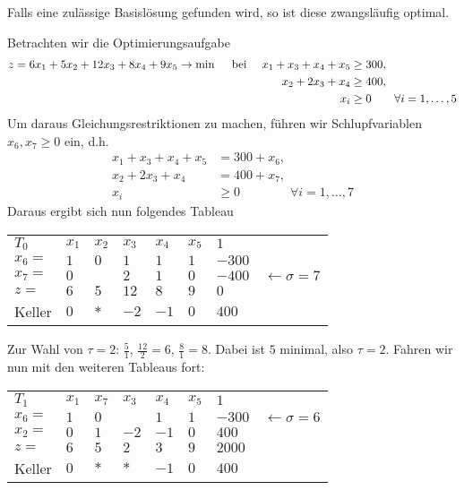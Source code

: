 \begin{bemerkung} %
	Falls eine zulässige Basislösung gefunden wird, so ist diese zwangsläufig optimal.
\end{bemerkung}

\begin{beispiel}
	Betrachten wir die Optimierungsaufgabe
	\begin{equation*}
		\begin{aligned}
			z = 6x_1 + 5x_2 + 12x_3 + 8x_4 + 9x_5 \to \min \quad \text{ bei } \quad 
			x_1 + x_3 + x_4 + x_5 &\ge 300, \\
			x_2 + 2x_3 + x_4 &\ge 400, \\
			x_i &\ge 0 \qquad \forall i = 1, \dots, 5
		\end{aligned}
	\end{equation*}
	Um daraus Gleichungsrestriktionen zu machen, führen wir Schlupfvariablen $x_6, x_7 \ge 0$ ein, d.h.
	\begin{equation*}
		\begin{aligned}
			x_1 + x_3 + x_4 + x_5 &= 300 + x_6 , \\
			x_2 + 2x_3 + x_4 &= 400 + x_7, \\
			x_i &\ge 0 \qquad \qquad \forall i = 1, \dots, 7
		\end{aligned}
	\end{equation*}
	Daraus ergibt sich nun folgendes Tableau
	\begin{indentpar}
		\begin{tabular}{R{1cm}|R{.5cm}R{.5cm}R{.5cm}R{.5cm}R{.5cm}|R{.9cm}l}
			$T_0$ & $x_1$ & $x_2$ & $x_3$ & $x_4$ & $x_5$ & $1$ \\ 
			$x_6 =$ & $1$ & $0$ & $1$ & $1$ & $1$ & $-300$ \\
			$x_7 =$ & $0$ &  & $2$ & $1$ & $0$ & $-400$ & $\leftarrow \sigma = 7$ \\ 
			$z =$   & $6$ & $5$ & $12$ & $8$ & $9$ & $0$ \\ 
			Keller  & $0$ & $\ast$ & $-2$ & $-1$ & $0$ & $400$
		\end{tabular}
	\end{indentpar}
	
	Zur Wahl von $\tau = 2$: $\frac{5}{1}$, $\frac{12}{2} = 6$, $\frac{8}{1} = 8$. Dabei ist $5$ minimal, also $\tau = 2$.
	Fahren wir nun mit den weiteren Tableaus fort:
	
	\begin{indentpar}
		\begin{tabular}{R{1cm}|R{.5cm}R{.5cm}R{.5cm}R{.5cm}R{.5cm}|R{.9cm}l}
			$T_1$   & $x_1$ & $x_7$  & $x_3$      & $x_4$ & $x_5$ & $1$ \\ \cline{1-7}
			$x_6 =$ & $1$   & $0$    &  & $1$   & $1$   & $-300$ & $\leftarrow \sigma = 6$ \\
			$x_2 =$ & $0$   & $1$    & $-2$       & $-1$  & $0$   & $400$ \\ \cline{1-7}
			$z =$   & $6$   & $5$    & $2$        & $3$   & $9$   & $2000$ \\ \cline{1-7}
			Keller  & $0$   & $\ast$ & $\ast$ & $-1$  & $0$   & $400$
		\end{tabular}


\end{indentpar}
\end{beispiel}
